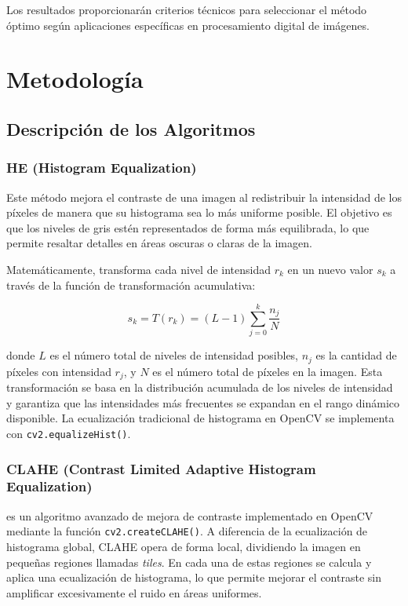 \documentclass[sigchi]{acmart}
\begin{document}
Los resultados proporcionarán criterios técnicos para seleccionar el método óptimo según
aplicaciones específicas en procesamiento digital de imágenes.

\section{Metodología}
\label{sec:metodologia}
\subsection{Descripción de los Algoritmos}
\label{subsec:algoritmos}

\subsubsection{\textbf{HE (Histogram Equalization)}}
\label{sssec:he}
Este método mejora el contraste de una imagen al redistribuir la
intensidad de los píxeles de manera que su histograma sea lo más uniforme posible. El objetivo
es que los niveles de gris estén representados de forma más equilibrada, lo que permite
resaltar detalles en áreas oscuras o claras de la imagen.

Matemáticamente, transforma cada nivel de intensidad $r_k$ en un nuevo valor $s_k$ a
través de la función de transformación acumulativa:

$$
	s_k = T(r_k) = (L-1)\sum_{j=0}^k \frac{n_j}{N}
$$

donde $L$ es el número total de niveles de intensidad posibles, $n_j$ es la cantidad de
píxeles con intensidad $r_j$, y $N$ es el número total de píxeles en la imagen. Esta
transformación se basa en la distribución acumulada de los niveles de intensidad y
garantiza que las intensidades más frecuentes se expandan en el rango dinámico disponible.
La ecualización tradicional de histograma en OpenCV se implementa con
\texttt{cv2.equalizeHist()}.

\subsubsection{\textbf{CLAHE (Contrast Limited Adaptive Histogram Equalization)}}
\label{sssec:clahe}
es un algoritmo avanzado de mejora de contraste implementado en OpenCV mediante la
función \texttt{cv2.createCLAHE()}. A diferencia de la ecualización de histograma global,
CLAHE opera de forma local, dividiendo la imagen en pequeñas regiones llamadas \textit{tiles}.
En cada una de estas regiones se calcula y aplica una ecualización de histograma, lo que permite
mejorar el contraste sin amplificar excesivamente el ruido en áreas uniformes.
\end{document}
